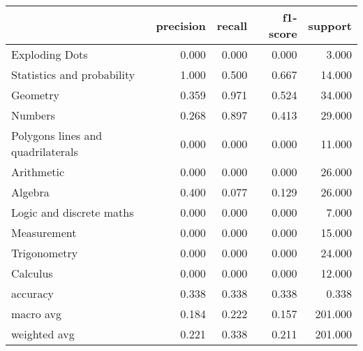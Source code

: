 \begin{tabular}{lrrrr}
\toprule
{} &  precision &  recall &  f1-score &  support \\
\midrule
Exploding Dots                    &      0.000 &   0.000 &     0.000 &    3.000 \\
Statistics and probability        &      1.000 &   0.500 &     0.667 &   14.000 \\
Geometry                          &      0.359 &   0.971 &     0.524 &   34.000 \\
Numbers                           &      0.268 &   0.897 &     0.413 &   29.000 \\
Polygons lines and quadrilaterals &      0.000 &   0.000 &     0.000 &   11.000 \\
Arithmetic                        &      0.000 &   0.000 &     0.000 &   26.000 \\
Algebra                           &      0.400 &   0.077 &     0.129 &   26.000 \\
Logic and discrete maths          &      0.000 &   0.000 &     0.000 &    7.000 \\
Measurement                       &      0.000 &   0.000 &     0.000 &   15.000 \\
Trigonometry                      &      0.000 &   0.000 &     0.000 &   24.000 \\
Calculus                          &      0.000 &   0.000 &     0.000 &   12.000 \\
accuracy                          &      0.338 &   0.338 &     0.338 &    0.338 \\
macro avg                         &      0.184 &   0.222 &     0.157 &  201.000 \\
weighted avg                      &      0.221 &   0.338 &     0.211 &  201.000 \\
\bottomrule
\end{tabular}
